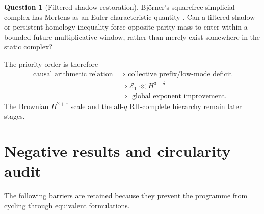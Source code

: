 \documentclass[11pt]{amsart}
\numberwithin{equation}{section}
\theoremstyle{plain}
\theoremstyle{definition}
\newtheorem{question}[theorem]{Question}
\theoremstyle{remark}
\newcommand{\eps}{\varepsilon}
\begin{document}
\begin{question}[Filtered shadow restoration]
\label{question:filtered-shadow}
Bj\"orner's squarefree simplicial complex has Mertens as an Euler-characteristic quantity \cite{Bjorner2011}.  Can a filtered shadow or
persistent-homology inequality force opposite-parity mass to enter within a bounded future multiplicative window, rather than merely
exist somewhere in the static complex?
\end{question}

The priority order is therefore
\begin{equation}
\boxed{
\begin{aligned}
\text{causal arithmetic relation}
&\Longrightarrow \text{ collective prefix/low-mode deficit}\\
&\Longrightarrow \mathcal E_1\ll H^{3-\delta}\\
&\Longrightarrow \text{ global exponent improvement}.
\end{aligned}}
\label{eq:priority-chain}
\end{equation}
The Brownian $H^{2+\eps}$ scale and the all-$q$ RH-complete hierarchy remain later stages.

\section{Negative results and circularity audit}
\label{sec:negative-audit}

The following barriers are retained because they prevent the programme from cycling through equivalent formulations.
\end{document}
